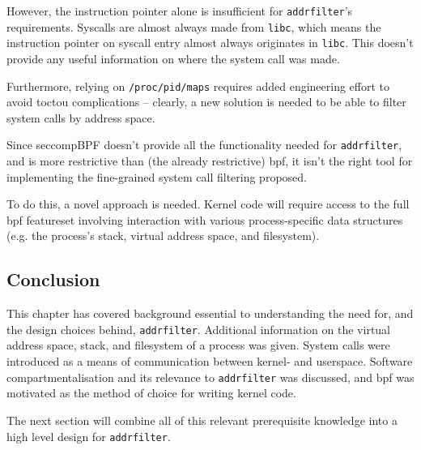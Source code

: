 However, the instruction pointer alone is insufficient for \texttt{addrfilter}'s
requirements. 
Syscalls are almost always made from \texttt{libc}, which means the instruction
pointer on syscall entry almost always originates in \texttt{libc}. This doesn't
provide any useful information on where the system call was made. 

Furthermore, relying on \texttt{/proc/pid/maps} requires added engineering
effort to avoid \ac{toctou} complications -- clearly, a new solution is needed
to be able to filter system calls by address space. 

Since seccompBPF doesn't provide all the functionality needed for 
\texttt{addrfilter}, and is more restrictive than (the already restrictive) 
\ac{bpf}, it isn't the right tool for implementing the fine-grained system
call filtering proposed.

To do this, a novel approach is needed. Kernel code will require access to the full
\ac{bpf} featureset involving interaction with various process-specific data
structures (e.g. the process's stack, virtual address space, and filesystem).

\subsection{Conclusion}

This chapter has covered background essential to understanding the need for, and
the design choices behind, \texttt{addrfilter}. Additional information on the
virtual address space, stack, and filesystem of a process was given. System
calls were introduced as a means of communication between kernel- and userspace.
Software compartmentalisation and its relevance to \texttt{addrfilter} was
discussed, and \ac{bpf} was motivated as the method of choice for writing kernel
code. 

The next section will combine all of this relevant prerequisite knowledge into a
high level design for \texttt{addrfilter}.

